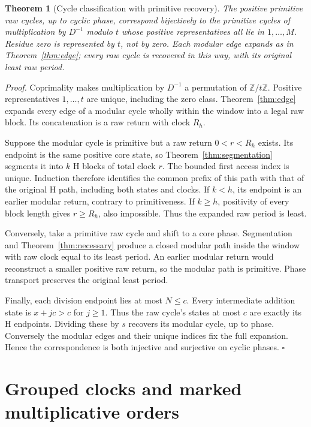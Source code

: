\documentclass[11pt,letterpaper]{article}
\newcommand{\Z}{\mathbb{Z}}
\newtheorem{theorem}{Theorem}
\newenvironment{proof}{\noindent\textit{Proof.}}{\hfill\(\square\)}
\begin{document}
\begin{theorem}[Cycle classification with primitive recovery]
\label{thm:classification}
The positive primitive raw cycles, up to cyclic phase, correspond bijectively
to the primitive cycles of multiplication by $D^{-1}$ modulo $t$ whose
positive representatives all lie in $1,\ldots,M$.
Residue zero is represented by $t$, not by zero. Each modular edge expands
as in Theorem~\ref{thm:edge}; every raw cycle is recovered in this way, with
its original least raw period.
\end{theorem}
\begin{proof}
Coprimality makes multiplication by $D^{-1}$ a permutation of $\Z/t\Z$.
Positive representatives $1,\ldots,t$ are unique, including the zero class.
Theorem~\ref{thm:edge} expands every edge of a modular cycle wholly within
the window into a legal raw block. Its concatenation is a raw return with
clock $R_h$.

Suppose the modular cycle is primitive but a raw return $0<r<R_h$ exists.
Its endpoint is the same positive core state, so
Theorem~\ref{thm:segmentation} segments it into $k$ H blocks of total clock
$r$. The bounded first access index is unique. Induction therefore identifies
the common prefix of this path with that of the original H path, including
both states and clocks. If $k<h$, its endpoint is an earlier modular return,
contrary to primitiveness. If $k\ge h$, positivity of every block length gives
$r\ge R_h$, also impossible. Thus the expanded raw period is least.

Conversely, take a primitive raw cycle and shift to a core phase.
Segmentation and Theorem~\ref{thm:necessary} produce a closed modular path
inside the window with raw clock equal to its least period. An earlier
modular return would reconstruct a smaller positive raw return, so the
modular path is primitive. Phase transport preserves the original least
period.

Finally, each division endpoint lies at most $N\le c$. Every intermediate
addition state is $x+jc>c$ for $j\ge1$. Thus the raw cycle's states at most
$c$ are exactly its H endpoints. Dividing these by $s$ recovers its modular
cycle, up to phase. Conversely the modular edges and their unique indices
fix the full expansion. Hence the correspondence is both injective and
surjective on cyclic phases.
\end{proof}

\section{Grouped clocks and marked multiplicative orders}
\end{document}
